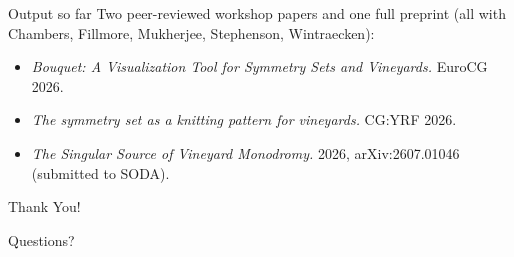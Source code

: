 \documentclass[
	11pt,
	aspectratio=169, %
]{beamer}
\begin{document}
\begin{frame}{Output so far}
    Two peer-reviewed workshop papers and one full preprint (all with Chambers,
    Fillmore, Mukherjee, Stephenson, Wintraecken):
    \begin{itemize}
        \item[{[P1]}] \emph{Bouquet: A Visualization Tool for Symmetry Sets and
              Vineyards.} EuroCG 2026.
        \item[{[P2]}] \emph{The symmetry set as a knitting pattern for vineyards.}
              CG:YRF 2026.
        \item[{[P3]}] \emph{The Singular Source of Vineyard Monodromy.} 2026,
              arXiv:2607.01046 (submitted to SODA).
    \end{itemize}
\end{frame}


\begin{frame}[plain]
	\begin{center}
		{\Huge Thank You!}

		\bigskip\bigskip

		{\LARGE Questions?}

		\bigskip
	\end{center}
\end{frame}

\end{document}
